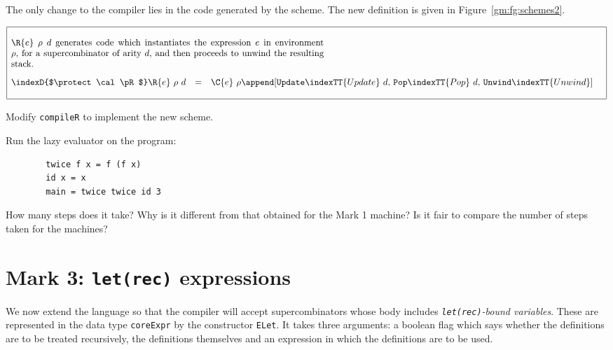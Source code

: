 The only change to the compiler lies in the code generated by the
\tR{} scheme. The new definition is given in
Figure~\ref{gm:fg:schemes2}.
\begin{figure*} %
$\begin{array}{|rcll|}
\hline
&&&\\
\multicolumn{4}{|l|}{\parbox[t]{29pc}{%
$\R{e}~\rho~d$ generates code which instantiates the expression $e$ in
environment $\rho$, for a supercombinator of arity $d$, and then proceeds
to unwind the resulting stack.}}\\
&&&\\
\indexD{$\protect\cal \pR$}\R{e}\ \rho\ d &
     = & \C{e}\ \rho \append [\mbox{\tt Update}\indexTT{Update}\ d,\, \mbox{\tt Pop}\indexTT{Pop}\ d,\,\mbox{\tt Unwind}\indexTT{Unwind}] & \\
&&&\\
\hline
\end{array}$
\caption{The \tR{} compilation scheme for Mark~2 G-machine}
\label{gm:fg:schemes2}
\end{figure*}

\begin{exercise}\label{gm:X:compileR}
Modify \mbox{\tt compileR} to implement the new \tR{} scheme.
\end{exercise}

\begin{exercise}\label{gm:X:run2}
Run the lazy evaluator on the program:
\begin{verbatim}
        twice f x = f (f x)
        id x = x
        main = twice twice id 3
\end{verbatim}
How many steps does it take? Why is it different from that obtained for
the Mark 1 machine? Is it fair to compare the number of steps taken
for the machines?
\end{exercise}

\section{Mark 3: \mbox{\tt let(rec)} expressions}
\label{gm:sc:mark3}

We now extend the language so that the compiler will accept
supercombinators whose body includes {\em \mbox{\tt let(rec)}-bound
variables}.  
These are represented
in the data type \mbox{\tt coreExpr} by the constructor \mbox{\tt ELet}.  It takes three
arguments: a boolean flag which says whether the definitions are to be
treated recursively, the definitions themselves and an expression in
which the definitions are to be used.

